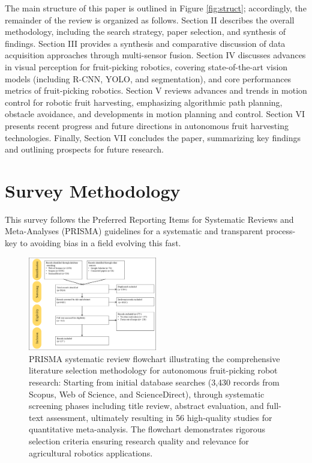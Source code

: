\documentclass[a4paper,fleqn]{cas-dc}
\begin{document}
The main structure of this paper is outlined in Figure \ref{fig:struct}; accordingly, the remainder of the review is organized as follows. Section II describes the overall methodology, including the search strategy, paper selection, and synthesis of findings. Section III provides a synthesis and comparative discussion of data acquisition approaches through multi-sensor fusion.
Section IV discusses advances in visual perception for fruit-picking robotics, covering state-of-the-art vision models (including R-CNN, YOLO, and segmentation), and core performances metrics of fruit-picking robotics. Section V reviews advances and trends in motion control for robotic fruit harvesting, emphasizing algorithmic path planning, obstacle avoidance, and developments in motion planning and control. Section VI presents recent progress and future directions in autonomous fruit harvesting technologies. Finally, Section VII concludes the paper, summarizing key findings and outlining prospects for future research.



\section{Survey Methodology}
This survey follows the Preferred Reporting Items for Systematic Reviews and Meta-Analyses (PRISMA) guidelines \cite{page2021prisma} for a systematic and transparent process-key to avoiding bias in a field evolving this fast. 

\begin{figure}[h!]
    \centering
    \includegraphics[width=0.5\textwidth]{fig_prisma1.png}
    \caption{ PRISMA systematic review flowchart illustrating the comprehensive literature selection methodology for autonomous fruit-picking robot research: Starting from initial database searches (3,430 records from Scopus, Web of Science, and ScienceDirect), through systematic screening phases including title review, abstract evaluation, and full-text assessment, ultimately resulting in 56 high-quality studies for quantitative meta-analysis. The flowchart demonstrates rigorous selection criteria ensuring research quality and relevance for agricultural robotics applications. 
    }
    \label{fig:prisma1}
\end{figure}
\end{document}
